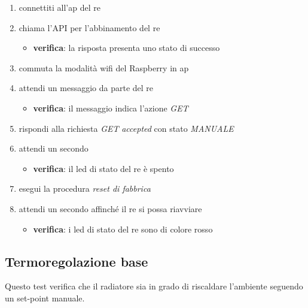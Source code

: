 \documentclass[12pt,a4paper,twoside,titlepage]{book}
\begin{document}
\begin{enumerate}
    \item connettiti all'\acrshort{ap} del \acrshort{re}
    \item chiama l'API per l'abbinamento del \acrshort{re} 
    \begin{itemize}
        \item \textbf{verifica}: la risposta presenta uno stato di successo 
    \end{itemize}
    \item commuta la modalità \Gls{wifi} del Raspberry in \acrshort{ap}
    \item attendi un messaggio da parte del \acrshort{re}
    \begin{itemize}
        \item \textbf{verifica}: il messaggio indica l'azione \textit{GET}
    \end{itemize}
    \item rispondi alla richiesta \textit{GET} \textit{accepted} con stato \textit{MANUALE}
    \item attendi un secondo 
    \begin{itemize}
        \item \textbf{verifica}: il \acrshort{led} di stato del \acrshort{re} è spento 
    \end{itemize}
    \item esegui la procedura \textit{reset di fabbrica}
    \item attendi un secondo affinché il \acrshort{re} si possa riavviare
    \begin{itemize}
        \item \textbf{verifica}: i \acrshort{led} di stato del \acrshort{re} sono di colore rosso
    \end{itemize}
\end{enumerate}

\subsection{Termoregolazione base}
\label{section:test_thermoregulation}

Questo test verifica che il radiatore sia in grado di riscaldare l'ambiente seguendo un set-point manuale.
\end{document}
